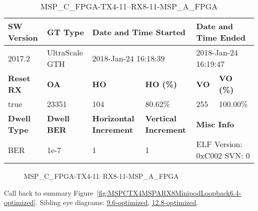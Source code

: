 \begin{table}[h]
\centering
\caption{MSP\_C\_FPGA-TX4-11--RX8-11-MSP\_A\_FPGA}
\label{tab:MSPCFPGATX411RX811MSPAFPGA6.4-optimized}
\begin{tabular}{@{}|l|l|l|l|l|l|@{}}
\toprule
\textbf{SW Version}                & \textbf{GT Type}   & \multicolumn{2}{l|}{\textbf{Date and Time Started}}            & \multicolumn{2}{l|}{\textbf{Date and Time Ended}}        \\ \midrule
2017.2                       & UltraScale GTH          & \multicolumn{2}{l|}{2018-Jan-24 16:18:39}                   & \multicolumn{2}{l|}{2018-Jan-24 16:19:47}               \\ \midrule
\textbf{Reset RX}                  & \textbf{OA} & \textbf{HO}   & \textbf{HO (\%)} & \textbf{VO} & \textbf{VO (\%)} \\ \midrule
true & 23351        & 104          & 80.62\%        & 255        & 100.00\%       \\ \midrule
\textbf{Dwell Type}                & \textbf{Dwell BER} & \textbf{Horizontal Increment} & \textbf{Vertical Increment}    & \multicolumn{2}{l|}{\textbf{Misc Info}}                  \\ \midrule
BER                            & 1e-7        & 1        & 1           & \multicolumn{2}{l|}{ELF Version: 0xC002 SVN: 0}                         \\ \bottomrule
\end{tabular}
\end{table}

\begin{figure}[h]
\caption{MSP\_C\_FPGA-TX4-11--RX8-11-MSP\_A\_FPGA} \label{fig:MSPCFPGATX411RX811MSPAFPGA6.4-optimized}
\end{figure}

Call back to summary Figure~\ref{fig:MSPCTX4MSPARX8MinipodLoopback6.4-optimized}.
Sibling eye diagrams: \hyperref[sec:MSPCFPGATX411RX811MSPAFPGA9.6-optimized]{9.6-optimized}, \hyperref[sec:MSPCFPGATX411RX811MSPAFPGA12.8-optimized]{12.8-optimized}.

\clearpage
\newpage

